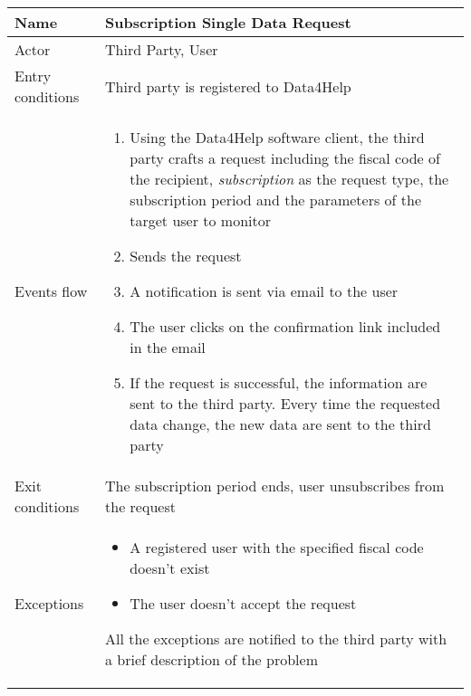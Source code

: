 \begin{table}[]
    \begin{tabular}{|l|p{12cm}|}
        \hline
        Name             & Subscription Single Data Request \\ \hline
        Actor            & Third Party, User \\ \hline
        Entry conditions & Third party is registered to Data4Help \\ \hline
        Events flow      & 
        \begin{enumerate}
            \item Using the Data4Help software client, the third party crafts a request including the fiscal code of the recipient, \textit{subscription} as the request type, the subscription period and the parameters of the target user to monitor
            \item Sends the request
            \item A notification is sent via email to the user
            \item The user clicks on the confirmation link included in the email
            \item If the request is successful, the information are sent to the third party. Every time the requested data change, the new data are sent to the third party
        \end{enumerate} \\ \hline
        Exit conditions  & The subscription period ends, user unsubscribes from the request \\ \hline
        Exceptions & 
        \begin{itemize}
            \item A registered user with the specified fiscal code doesn't exist
            \item The user doesn't accept the request
        \end{itemize} All the exceptions are notified to the third party with a brief description of the problem \\ \hline
    \end{tabular}
\end{table}

\newpage

